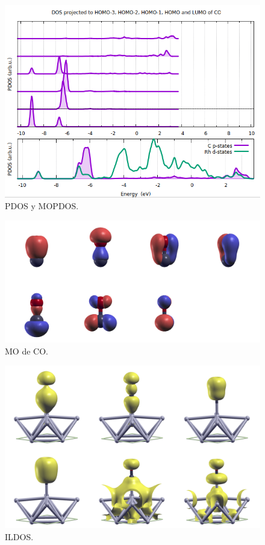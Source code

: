     \begin{figure}[H]
        \centering
        \includegraphics[scale = 0.7]{figs/D3/CO_DOS.png}
        \caption{PDOS y MOPDOS.}
    \end{figure}

    \begin{figure}[H]
        \centering
        \includegraphics[scale = 0.2]{figs/D3/psi2-montage.png}
        \caption{MO de CO.}
    \end{figure}

    \begin{figure}[H]
        \centering
        \includegraphics[scale = 0.2]{figs/D3/ildos-montage.png}
        \caption{ILDOS.}
    \end{figure}

